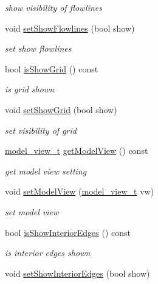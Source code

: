 \begin{DoxyCompactItemize}
\begin{DoxyCompactList}\small\item\em show visibility of flowlines \end{DoxyCompactList}\item 
void \hyperlink{classShipCAD_1_1Visibility_a805b3f5f4a8d7c6b578a79c2539cf192}{set\+Show\+Flowlines} (bool show)
\begin{DoxyCompactList}\small\item\em set show flowlines \end{DoxyCompactList}\item 
bool \hyperlink{classShipCAD_1_1Visibility_a9aa81550e01813b9ec84b40aba5f904e}{is\+Show\+Grid} () const 
\begin{DoxyCompactList}\small\item\em is grid shown \end{DoxyCompactList}\item 
void \hyperlink{classShipCAD_1_1Visibility_a57b601879f10927beb3d466c211e6ee6}{set\+Show\+Grid} (bool show)
\begin{DoxyCompactList}\small\item\em set visibility of grid \end{DoxyCompactList}\item 
\hyperlink{namespaceShipCAD_a742f9cd95e62e207769e17467ecd5bb7}{model\+\_\+view\+\_\+t} \hyperlink{classShipCAD_1_1Visibility_a34d56f9e9467b9749c6b50adfe8a0493}{get\+Model\+View} () const 
\begin{DoxyCompactList}\small\item\em get model view setting \end{DoxyCompactList}\item 
void \hyperlink{classShipCAD_1_1Visibility_a017115fc25ec3a7363033dcca873f38f}{set\+Model\+View} (\hyperlink{namespaceShipCAD_a742f9cd95e62e207769e17467ecd5bb7}{model\+\_\+view\+\_\+t} vw)
\begin{DoxyCompactList}\small\item\em set model view \end{DoxyCompactList}\item 
bool \hyperlink{classShipCAD_1_1Visibility_a63588a3b8aa0a7dd37b19173a4802b47}{is\+Show\+Interior\+Edges} () const 
\begin{DoxyCompactList}\small\item\em is interior edges shown \end{DoxyCompactList}\item 
void \hyperlink{classShipCAD_1_1Visibility_a2ce6cd0c56750e6638b5e195e6bc5590}{set\+Show\+Interior\+Edges} (bool show)

\end{DoxyCompactItemize}
